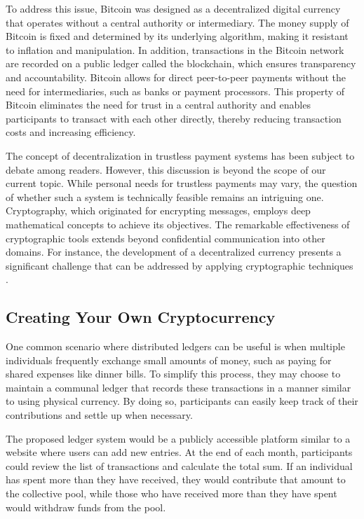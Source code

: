 To address this issue, Bitcoin was designed as a decentralized digital currency that operates without a central authority or intermediary. The money supply of Bitcoin is fixed and determined by its underlying algorithm, making it resistant to inflation and manipulation. In addition, transactions in the Bitcoin network are recorded on a public ledger called the blockchain, which ensures transparency and accountability. Bitcoin allows for direct peer-to-peer payments without the need for intermediaries, such as banks or payment processors. This property of Bitcoin eliminates the need for trust in a central authority and enables participants to transact with each other directly, thereby reducing transaction costs and increasing efficiency.

The concept of decentralization in trustless payment systems has been subject to debate among readers. However, this discussion is beyond the scope of our current topic. While personal needs for trustless payments may vary, the question of whether such a system is technically feasible remains an intriguing one. Cryptography, which originated for encrypting messages, employs deep mathematical concepts to achieve its objectives. The remarkable effectiveness of cryptographic tools extends beyond confidential communication into other domains. For instance, the development of a decentralized currency presents a significant challenge that can be addressed by applying cryptographic techniques \cite{diffie2022new}.

\subsection{Creating Your Own Cryptocurrency}
One common scenario where distributed ledgers can be useful is when multiple individuals frequently exchange small amounts of money, such as paying for shared expenses like dinner bills. To simplify this process, they may choose to maintain a communal ledger that records these transactions in a manner similar to using physical currency. By doing so, participants can easily keep track of their contributions and settle up when necessary.

%

The proposed ledger system would be a publicly accessible platform similar to a website where users can add new entries. At the end of each month, participants could review the list of transactions and calculate the total sum. If an individual has spent more than they have received, they would contribute that amount to the collective pool, while those who have received more than they have spent would withdraw funds from the pool.


